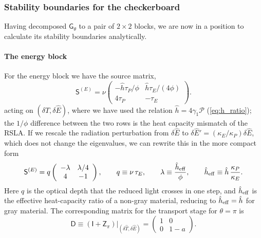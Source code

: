 \documentclass[preprint,12pt,authoryear]{elsarticle}
\newcommand{\tenS}{\mathsf{S}}
\newcommand{\tenI}{\mathsf{I}}
\newcommand{\tenG}{\mathsf{G}}
\newcommand{\tenZ}{\mathsf{Z}}
\providecommand{\tenD}{\mathsf{D}}
\newcommand{\hE}{\hat{E}}
\newcommand{\hT}{\hat{T}}
\newcommand{\calP}{\mathcal{P}}
\begin{document}
\subsubsection{Stability boundaries for the checkerboard}
\label{sssec:stabilty_checkerboard}

Having decomposed $\tenG_\theta$ to a pair of $2\times 2$ blocks, we are now in a position to calculate its stability boundaries analytically.

\paragraph{The energy block} For the energy block we have the source matrix,
\begin{equation}
    \tenS^{(E)} = \nu\left(\begin{array}{cc} -\hat{h}\tau_P/\phi & \hat{h}\tau_E/(4\phi) \\ 4\tau_P & -\tau_E \end{array}\right).
    \label{eq:SE_nongray}
\end{equation}
acting on $(\delta\hT, \delta\hE)$, where we have used the relation $\hat{h} = 4\gamma_1 \calP$ (\autoref{eq:h_ratio}); the $1/\phi$ difference between the two rows is the heat capacity mismatch of the RSLA. If we rescale the radiation perturbation from $\delta\hE$ to $\delta\hE' = (\kappa_E/\kappa_P)\delta\hE$, which does not change the eigenvalues, we can rewrite this in the more compact form
\begin{equation}
    \tenS^{(E)} = q\left(\begin{array}{cc} -\lambda & \lambda/4 \\ 4 & -1 \end{array}\right),
    \qquad
    q \equiv \nu\,\tau_E,
    \qquad
    \lambda \equiv \frac{\hat{h}_{\rm eff}}{\phi},
    \qquad
    \hat{h}_{\rm eff} \equiv \hat{h}\,\frac{\kappa_P}{\kappa_E} .
    \label{eq:SE}
\end{equation}
Here $q$ is the optical depth that the reduced light crosses in one step, and $\hat{h}_{\rm eff}$ is the effective heat-capacity ratio of a non-gray material, reducing to $\hat{h}_{\rm eff} = \hat{h}$ for gray material. The corresponding matrix for the transport stage for $\theta = \pi$ is
\begin{equation}
    \tenD \equiv \left(\tenI + \tenZ_\pi\right)\big|_{(\delta\hT, \delta\hE)} = \left(\begin{array}{cc} 1 & 0 \\ 0 & 1 - a \end{array}\right).
    \label{eq:D_energy}
\end{equation}
\end{document}
